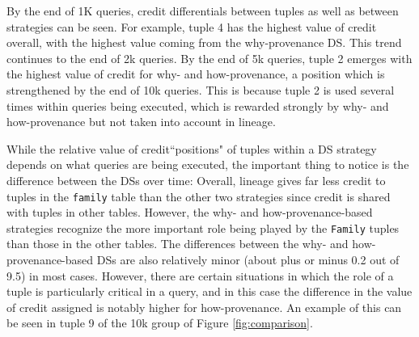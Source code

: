By the end of 1K queries, credit differentials between tuples as well as between strategies can be seen.  For example, tuple 4 has the highest value of credit overall, with the highest value coming from the why-provenance DS.   This trend continues to the end of 2k queries.
By the end of 5k queries, tuple 2 emerges with the highest value of credit for why- and how-provenance, a position which is strengthened by the end of 10k queries. This is because tuple 2 is used several times within queries being executed, which is rewarded strongly by why- and how-provenance but not taken into account in lineage.

While the relative value of credit``positions" of tuples within a DS strategy depends on what queries are being executed, the important thing to notice is the difference between the DSs over time:  Overall, lineage gives far less credit to tuples in the \texttt{family} table than the other two strategies since credit is  shared with tuples in other tables.
However, the why- and how-provenance-based strategies recognize the more important role being played by the \texttt{Family} tuples than those in the other tables.
The differences between the why- and how-provenance-based DSs are also relatively minor (about plus or minus 0.2 out of 9.5) in most cases. However, there are certain situations in which the role of a tuple is particularly critical in a query, and in this case the difference in the value of credit assigned is notably higher for how-provenance.  An example of this can be seen in tuple 9 of the 10k group of Figure \ref{fig:comparison}. 


